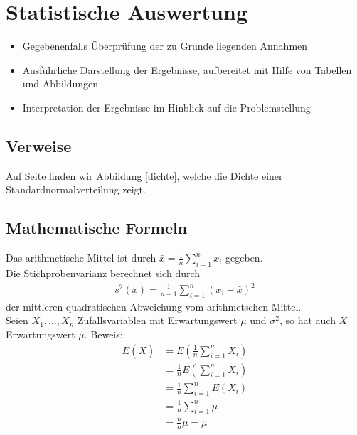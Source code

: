 \documentclass[a4paper,12pt]{article}
\begin{document}

%

\section{Statistische Auswertung}
\begin{itemize}
\item Gegebenenfalls Überprüfung der zu Grunde liegenden Annahmen
\item Ausführliche Darstellung der Ergebnisse, aufbereitet mit Hilfe von Tabellen und
Abbildungen
\item Interpretation der Ergebnisse im Hinblick auf die Problemstellung
\end{itemize}

\subsection{Verweise}
Auf Seite \pageref{dichte} finden wir Abbildung \ref{dichte}, welche die Dichte einer Standardnormalverteilung zeigt.

\subsection{Mathematische Formeln}

Das arithmetische Mittel ist durch $\bar{x}=\frac{1}{n} \sum_{i=1}^n x_i$ gegeben.\\
Die Stichprobenvarianz berechnet sich durch 
\begin{align}
\label{Varianz} 
s^2(x) =\frac{1}{n-1}\sum_{i=1}^n (x_i - \bar{x})^2
\end{align} 
der mittleren quadratischen
Abweichung vom arithmetschen Mittel.\\

Seien $X_1,\ldots,X_n$
Zufallsvariablen mit Erwartungswert $\mu$ und $\sigma^2$, so hat auch $\bar{X}$
Erwartungswert $\mu$. Beweis:
\begin{align*}
E(\bar{X}) &= E \left( \frac{1}{n} \sum_{i=1}^n X_i \right) \\
    &= \frac{1}{n} E \left( \sum_{i=1}^n X_i \right)  \\
    &= \frac{1}{n} \sum_{i=1}^n E(X_i)  \\
    &= \frac{1}{n} \sum_{i=1}^n \mu     \\
    &= \frac{n}{n} \mu  =\mu
\end{align*}
\end{document}
